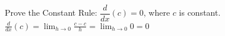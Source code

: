 {Prove the Constant Rule: $\dfrac {d}{dx} (c)=0$, where $c$ is constant.}
{$\displaystyle\frac {d}{dx}(c) = \lim_{h\to 0} \frac{c - c}{h}=\lim_{h\to 0}0=0$}
